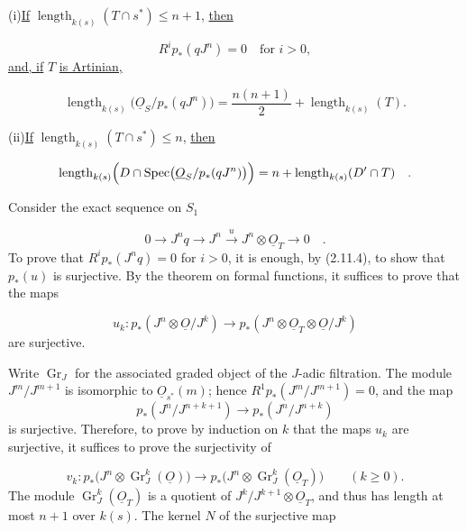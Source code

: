 (i)\quad \underline{If}
$\operatorname{length}_{k(s)}(T\cap s^*)\leq n+1$, \underline{then}

\begin{equation*}
R^ip_*(qJ^n)=0\quad\text{for }i>0,
\end{equation*}
\underline{and, if} $T$ \underline{is Artinian,}

\begin{equation*}
\operatorname{length}_{k(s)}
\bigl(\underline{O}_S/p_*(qJ^n)\bigr)
=\frac{n(n+1)}2+\operatorname{length}_{k(s)}(T).
\end{equation*}


(ii)\quad \underline{If}
$\operatorname{length}_{k(s)}(T\cap s^*)\leq n$, \underline{then}

\begin{equation*}
\operatorname{length}_{k(s)}
\Bigl(D\cap
\operatorname{Spec}\bigl(\underline{O}_S/p_*(qJ^n)\bigr)\Bigr)
=n+\operatorname{length}_{k(s)}(D'\cap T) \quad .
\end{equation*}

Consider the exact sequence on $S_1$

\begin{equation}\tag{2.14.1}
0\longrightarrow J^nq
\longrightarrow J^n
\xrightarrow{\,u\,}J^n\otimes\underline{O}_T
\longrightarrow0 \quad .
\end{equation}
To prove that $R^ip_*(J^nq)=0$ for $i>0$, it is enough, by (2.11.4), to show
that $p_*(u)$ is surjective.  By the theorem on formal functions, it suffices to
prove that the maps

\begin{equation*}
u_k:p_*(J^n\otimes\underline{O}/J^k)
\longrightarrow
p_*(J^n\otimes\underline{O}_T\otimes\underline{O}/J^k)
\end{equation*}
are surjective.

Write $\operatorname{Gr}_J$ for the associated graded object of the $J$-adic
filtration.  The module $J^m/J^{m+1}$ is isomorphic to
$\underline{O}_{s^*}(m)$; hence $R^1p_*(J^m/J^{m+1})=0$, and the map
\[
p_*(J^n/J^{n+k+1})\longrightarrow p_*(J^n/J^{n+k})
\]
is surjective.  Therefore, to prove by induction on $k$ that the maps $u_k$ are
surjective, it suffices to prove the surjectivity of

\begin{equation*}
v_k:p_*\bigl(J^n\otimes\operatorname{Gr}_J^k(\underline{O})\bigr)
\longrightarrow
p_*\bigl(J^n\otimes\operatorname{Gr}_J^k(\underline{O}_T)\bigr)
\qquad(k\geq0).
\end{equation*}
The module $\operatorname{Gr}_J^k(\underline{O}_T)$ is a quotient of
$J^k/J^{k+1}\otimes\underline{O}_T$, and thus has length at most $n+1$ over
$k(s)$.  The kernel $N$ of the surjective map

